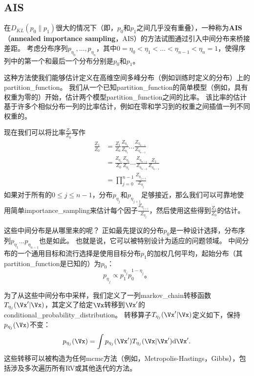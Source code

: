 \subsection{\gls{AIS}}
\label{subsec:annealed_importance_sampling}
在$D_{KL}(p_0 \| p_1)$很大的情况下（即，$p_0$和$p_1$之间几乎没有重叠），一种称为\textbf{\gls{AIS}}（\textbf{annealed importance sampling}，AIS）的方法试图通过引入中间分布来桥接差距\citep{Jarzynski1997,Neal-2001}。
考虑分布序列$p_{\eta_0},\dots,p_{\eta_n}$，其中$0=\eta_0 < \eta_1 < \dots < \eta_{n-1} < \eta_n = 1$，使得序列中的第一个和最后一个分布分别是$p_0$和$p_1$。


这种方法使我们能够估计定义在高维空间多峰分布（例如训练时定义的分布）上的\gls{partition_function}。
我们从一个已知\gls{partition_function}的简单模型（例如，具有权重为零的）开始，估计两个模型\gls{partition_function}之间的比率。
该比率的估计基于许多个相似分布一列的比率估计，例如在零和学习到的权重之间插值一列不同权重的。


现在我们可以将比率$\frac{Z_1}{Z_0}$写作
\begin{align}
\frac{Z_1}{Z_0} &= \frac{Z_1}{Z_0} \frac{Z_{\eta_1}}{Z_{\eta_1}} \dots \frac{Z_{\eta_{n-1}}}{Z_{\eta_{n-1}}} \\
&= \frac{Z_{\eta_1}}{Z_{0}}  \frac{Z_{\eta_2}}{Z_{\eta_1}}  \dots \frac{Z_{\eta_{n-1}}}{Z_{\eta_{n-2}}} \frac{Z_{1}}{Z_{\eta_{n-1}}} \\
&= \prod_{j=0}^{n-1} \frac{ Z_{\eta_{j+1}} }{Z_{\eta_j}} \label{eq:18.49}
\end{align}
如果对于所有的$0 \leq j \leq n-1$，分布$p_{\eta_j}$和$p_{\eta_{j+1}}$足够接近，那么我们可以可靠地使用简单\gls{importance_sampling}来估计每个因子$\frac{Z_{\eta_{j+1}}}{ Z_{\eta_j}}$，然后使用这些得到$\frac{Z_1}{Z_0}$的估计。


这些中间分布是从哪里来的呢？
正如最先提议的分布$p_0$是一种设计选择，分布序列$p_{\eta_1} \dots p_{\eta_{n-1}}$也是如此。
也就是说，它可以被特别设计为适应的问题领域。
中间分布的一个通用目标和流行选择是使用目标分布$p_1$的加权几何平均，起始分布（其\gls{partition_function}是已知的）为$p_0$：
\begin{equation}
	p_{\eta_j} \propto p_1^{\eta_j} p_0^{1-\eta_j}。
\end{equation}


为了从这些中间分布中采样，我们定义了一列\gls{markov_chain}转移函数$T_{\eta_j}(\Vx' | \Vx)$，其定义了给定$\Vx$转移到$\Vx'$的\gls{conditional_probability_distribution}。
转移算子$T_{\eta_j}(\Vx' | \Vx)$定义如下，保持$p_{\eta_j}(\Vx)$不变：
\begin{equation}
	p_{\eta_j}(\Vx) = \int p_{\eta_j} (\Vx') T_{\eta_j} (\Vx | \Vx') \mathrm{d}\Vx'.
\end{equation}
这些转移可以被构造为任何\gls{mcmc}方法（例如，Metropolis-Hastings，Gibbs），包括涉及多次遍历所有\gls{RV}或其他迭代的方法。


